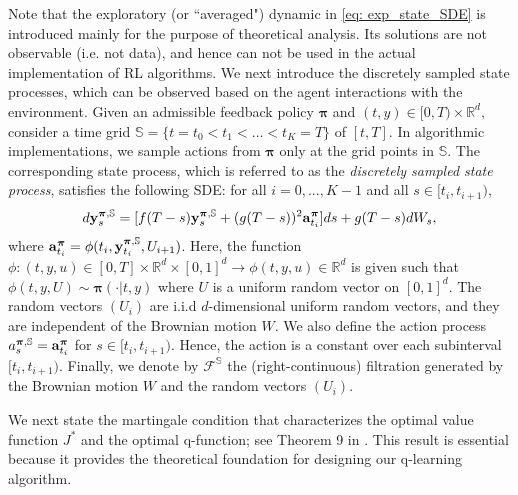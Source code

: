 \documentclass[11pt]{article}
\newcommand{\bpi}{\boldsymbol{\pi}}
\begin{document}
Note that the exploratory (or ``averaged") dynamic in \eqref{eq: exp_state_SDE} is introduced mainly for the purpose of theoretical analysis. Its solutions are not observable (i.e. not data), and hence can not be used in the actual implementation of RL algorithms. We next introduce the discretely sampled state processes, which can be observed based on the agent interactions with the environment.
      Given an admissible feedback policy $\bpi$ and  $(t,y) \in [0,T) \times \mathbb{R}^d,$ consider a time grid $\mathbb{S}= \{t = t_0 < t_1 < \ldots < t_K = T\}$ of $[t, T]$. In algorithmic implementations, we sample actions from $\bpi$ only at the grid points in $\mathbb{S}$.
The corresponding state process, which is referred to as the \emph{discretely sampled state process}, satisfies the following SDE: for all $i = 0, . . . , K - 1$ and all $s \in [t_{i}, t_{i+1})$,
\begin{align} \label{eq:samplestate}
d \mathbf{y}^{\bpi, \mathbb{S}}_s
= [f(T-s) \mathbf{y}^{\bpi, \mathbb{S}}_s + (g(T-s))^{2} {\bf a}^{\bpi}_{t_i} ] ds + g(T-s)  dW_s,
\end{align}
where ${\bf a}^{\bpi}_{t_i}= \phi (t_i, \mathbf{y}^{\bpi, \mathbb{S}}_{t_i}, U_{i+1})$. Here, the function $\phi: (t, y, u) \in [0,T] \times \mathbb{R}^d \times [0,1]^{d} \rightarrow  \phi(t,y,u ) \in \mathbb{R}^d$ is given such that $\phi(t,y, U) \sim \bpi(\cdot|t,y)$ where $U$ is a uniform random vector on $[0,1]^{d}$. The random vectors $(U_i)$ are i.i.d $d$-dimensional uniform random vectors, and they are independent of the Brownian motion $W$. We also define the action process $a_{s}^{\bpi, \mathbb{S}} =  {\bf a}^{\bpi}_{t_i}$ for $s \in [t_{i}, t_{i+1})$. Hence, the action is a constant over each subinterval $[t_{i}, t_{i+1})$. Finally, we denote by $\mathcal{F}^{\mathbb{S}}$ the (right-continuous) filtration generated by the Brownian motion $W$ and the random vectors $(U_i)$.






We next state the martingale condition that characterizes the optimal value function $J^*$ and the optimal q-function; see Theorem 9 in \citep{jia2025erratum}.  This result is essential because it provides the theoretical foundation for designing our q-learning algorithm.
\end{document}
